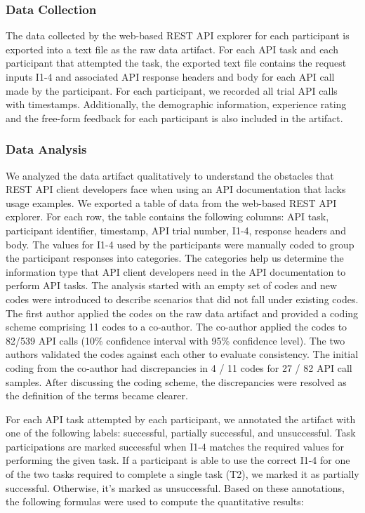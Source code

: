 \subsubsection{Data Collection} %
The data collected by the web-based REST API explorer for each participant is exported into a text file as the raw data artifact. For each API task and each participant that attempted the task, the exported text file contains the request inputs I1-4 and associated API response headers and body for each API call made by the participant. For each participant, we recorded all trial API calls with timestamps. Additionally, the demographic information, experience rating and the free-form feedback for each participant is also included in the artifact.



\subsubsection{Data Analysis}
We analyzed the data artifact qualitatively to understand the obstacles that REST API client developers face when using an API documentation that lacks usage examples. We exported a table of data from the web-based REST API explorer. For each row, the table contains the following columns: API task, participant identifier, timestamp, API trial number, I1-4, response headers and body. The values for I1-4 used by the participants were manually coded to group the participant responses into categories. The categories help us determine the information type that API client developers need in the API documentation to perform API tasks. The analysis started with an empty set of codes and new codes were introduced to describe scenarios that did not fall under existing codes. The first author applied the codes on the raw data artifact and provided a coding scheme comprising 11 codes to a co-author. The co-author applied the codes to 82/539 API calls (10\% confidence interval with 95\% confidence level). The two authors validated the codes against each other to evaluate consistency. The initial coding from the co-author had discrepancies in 4 / 11 codes for 27 / 82 API call samples. After discussing the coding scheme, the discrepancies were resolved as the definition of the terms became clearer.

For each API task attempted by each participant, we annotated the artifact with one of the following labels: successful, partially successful, and unsuccessful. Task participations are marked successful when I1-4 matches the required values for performing the given task. If a participant is able to use the correct I1-4 for one of the two tasks required to complete a single task (T2), we marked it as partially successful. Otherwise, it's marked as unsuccessful. Based on these annotations, the following formulas were used to compute the quantitative results:



